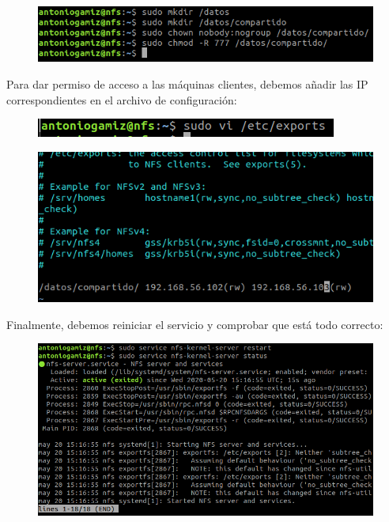 \documentclass[12pt]{article}
\begin{document}
\begin{figure}[H]
\center
\includegraphics[scale=0.4]{7.png}
\end{figure}

Para dar permiso de acceso a las máquinas clientes, debemos añadir las IP correspondientes en el archivo de configuración:

\begin{figure}[H]
\center
\includegraphics[scale=0.4]{9.png}
\end{figure}
\begin{figure}[H]
\center
\includegraphics[scale=0.4]{8.png}
\end{figure}

Finalmente, debemos reiniciar el servicio y comprobar que está todo correcto:

\begin{figure}[H]
\center
\includegraphics[scale=0.4]{10.png}
\end{figure}
\end{document}
